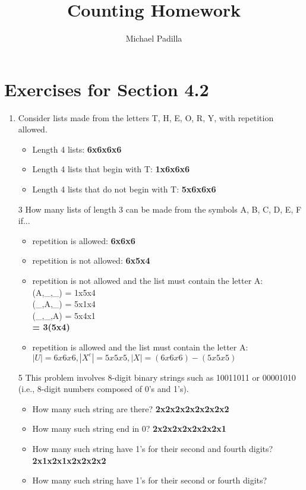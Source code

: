 \documentclass[12pt]{article}
\title{Counting Homework}
\author{Michael Padilla}
\begin{document}
 
\maketitle
\section*{Exercises for Section 4.2}
\begin{enumerate}
    \item Consider lists made from the letters T, H, E, O, R, Y, with repetition allowed.
	\begin{itemize}
	    \item Length 4 lists: \textbf{6x6x6x6}
	    \item Length 4 lists that begin with T: \textbf{1x6x6x6}
	    \item Length 4 lists that do not begin with T: \textbf{5x6x6x6}
	\end{itemize}
    \item [3] How many lists of length 3 can be made from the symbols A, B, C, D, E, F if...
	\begin{itemize}
	    \item repetition is allowed: \textbf{6x6x6}
	    \item repetition is not allowed: \textbf{6x5x4}
	    \item repetition is not allowed and the list must contain the letter A:\\
		(A,\_,\_) = 1x5x4\\
		(\_,A,\_) = 5x1x4\\
		(\_,\_,A) = 5x4x1\\
		\textbf{= 3(5x4)}
	    \item repetition is allowed and the list must contain the letter A:\\
		$|U| = 6x6x6, |X^c| = 5x5x5, |X| = (6x6x6)-(5x5x5)$
	\end{itemize}
    \item [5] This problem involves 8-digit binary strings such as 10011011 or 00001010 (i.e.,
8-digit numbers composed of 0’s and 1’s).
	\begin{itemize}
	    \item How many such string are there? \textbf{2x2x2x2x2x2x2x2}
	    \item How many such string end in 0? \textbf{2x2x2x2x2x2x2x1}
	    \item How many such string have 1's for their second and fourth digits? \textbf{2x1x2x1x2x2x2x2}
	    \item How many such string have 1's for their second or fourth digits?\\

\end{itemize}
\end{enumerate}
\end{document}
